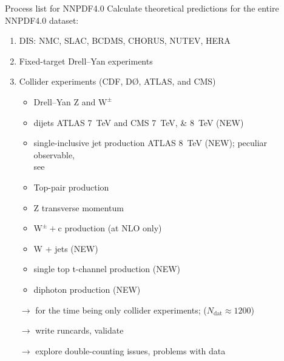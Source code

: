 \begin{frame}{Process list for NNPDF4.0}
Calculate theoretical predictions for the entire NNPDF4.0 dataset:
\begin{enumerate}
\item DIS: NMC, SLAC, BCDMS, CHORUS, NUTEV, HERA
\item Fixed-target Drell--Yan experiments
\item Collider experiments (CDF, D{\O}, ATLAS, and CMS)
\begin{itemize}
\item Drell--Yan $\mathrm{Z}$ and $\mathrm{W}^\pm$
\item dijets ATLAS \SI{7}{\tera\electronvolt} and CMS \SIlist{7;8}{\tera\electronvolt} (NEW)
\item single-inclusive jet production ATLAS \SI{8}{\tera\electronvolt} (NEW); peculiar observable,\\
see 
\item Top-pair production
\item Z transverse momentum
\item $\mathrm{W}^\pm + \mathrm{c}$ production (at NLO only)
\item W + jets (NEW)
\item single top t-channel production (NEW)
\item diphoton production (NEW)
\end{itemize}
\end{enumerate}

\vspace*{\fill}

\begin{itemize}
\item[$\rightarrow$] for the time being \alert{only collider experiments}; ($N_\text{dat} \approx 1200$)\\
\item[$\rightarrow$] write runcards, validate\\
\item[$\rightarrow$] \alert{explore double-counting issues}, problems with data
\end{itemize}
\end{frame}

